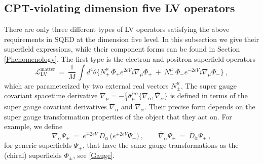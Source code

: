 \documentclass[12pt]{revtex4}
\begin{document}
\subsection{CPT-violating dimension five LV operators}
\label{Dim5LV}


There are only three different types of LV operators satisfying the 
above requirements in SQED at the
dimension five level. In this subsection we give their superfield
expressions, while their component forms can be found in Section
\ref{Phenomenology}. The first type is the electron and positron 
superfield operators  
\begin{equation}
\label{LV_matter}
  \mathcal{L}_{\mathrm{LV}}^{\mathrm{matter}} ~=~ 
\frac{1}{M}\,   \int d^4\theta \Big\{ 
N_+^\mu\, \overline{\Phi}_+ e^{2eV} i \nabla_\mu \Phi_+ 
~+~ N_{-}^\mu\, \overline{\Phi}_- e^{-2eV} i \nabla_\mu  {\Phi}_-
                 \Big\}~, 
\end{equation}
%
which are parameterized by two external real vectors $N_\pm^\mu$.  
The super gauge covariant spacetime derivative 
$\nabla_\mu   =  - \frac{i}{4} 
\bar{\sigma}_\mu^{\dot{\alpha}\alpha}
\{ \nabla_\alpha, \overline{\nabla}_{\dot{\alpha}} \} 
$ 
is defined in terms of the super gauge covariant derivatives 
$\nabla_\alpha$ and $\overline{\nabla}_{\dot{\alpha}}$. Their precise
form depends on the super gauge transformation properties of the
object that they act on. For example, we define 
%
\begin{equation}
\nabla_\alpha \Psi_\pm ~=~ 
e^{\mp 2eV} \, D_\alpha \, \big( e^{\pm 2eV} \Psi_\pm \big)~, 
\qquad 
\overline{\nabla}_{\dot{\alpha}} \Psi_\pm ~=~
\overline{D}_{\dot{\alpha}} \Psi_\pm~,
\end{equation} 
%
for generic superfields $\Psi_\pm$, that have the same gauge
transformations as the (chiral) superfields $\Phi_\pm$, see 
\eqref{Gauge}. 
\end{document}
